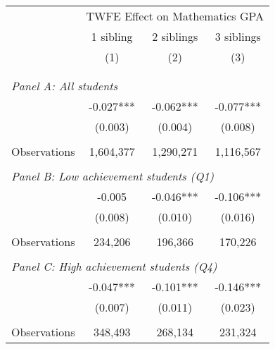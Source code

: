 \makeatletter
{}
{
\makeatother
\begin{tabular}{lccc}
\toprule
\cmidrule(lr){2-4}
& \multicolumn{3}{c}{TWFE Effect on Mathematics GPA} \\
\cmidrule(lr){2-4}
& 1 sibling & 2 siblings & 3 siblings  \\
\cmidrule(lr){2-2} \cmidrule(lr){3-3} \cmidrule(lr){4-4}
& (1) & (2) & (3)\\
\bottomrule
&  &  &  \\
&  &  &   \\
\multicolumn{4}{l}{\textit{Panel A: All students}} \\
\hspace{3mm}        &      -0.027***&      -0.062***&      -0.077***\\
                    &     (0.003)   &     (0.004)   &     (0.008)   \\
                    &               &               &               \\
\hspace{3mm}Observations&   1,604,377   &   1,290,271   &   1,116,567   \\
 
&  &  &   \\
\multicolumn{4}{l}{\textit{Panel B: Low achievement students (Q1)}} \\
\hspace{3mm}        &      -0.005   &      -0.046***&      -0.106***\\
                    &     (0.008)   &     (0.010)   &     (0.016)   \\
                    &               &               &               \\
\hspace{3mm}Observations&     234,206   &     196,366   &     170,226   \\
 
&  &  &   \\
\multicolumn{4}{l}{\textit{Panel C: High achievement students (Q4)}} \\
\hspace{3mm}        &      -0.047***&      -0.101***&      -0.146***\\
                    &     (0.007)   &     (0.011)   &     (0.023)   \\
                    &               &               &               \\
\hspace{3mm}Observations&     348,493   &     268,134   &     231,324   \\
 

\end{tabular}}
